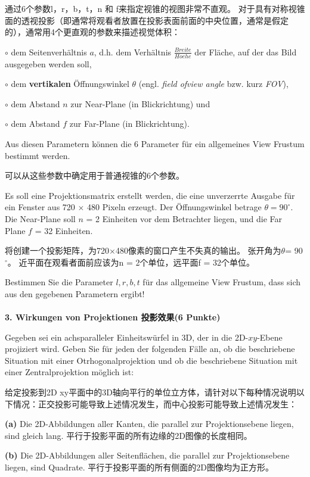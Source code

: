 \documentclass[fleqn]{article}
\begin{document}
通过6个参数l，r，b，t，n 和 f来指定视锥的视图非常不直观。 对于具有对称视锥面的透视投影（即通常将观看者放置在投影表面前面的中央位置，通常是假定的），通常用4个更直观的参数来描述视觉体积：

\indent\indent $\circ$ dem Seitenverhältnis $a$, d.h. dem Verhältnis $\frac{Breite}{Hoehe}$ der Fläche, auf der das Bild ausgegeben werden soll,

\indent\indent $\circ$ dem \textbf{vertikalen} Öffnungswinkel $\theta$ (engl. \textit{field ofview angle} bzw. kurz \textit{FOV}),

\indent\indent $\circ$ dem Abstand $n$ zur Near-Plane (in Blickrichtung) und

\indent\indent $\circ$ dem Abstand $f$ zur Far-Plane (in Blickrichtung).

Aus diesen Parametern können die 6 Parameter für ein allgemeines View Frustum bestimmt werden.

可以从这些参数中确定用于普通视锥的6个参数。

Es soll eine Projektionsmatrix erstellt werden,
 die eine unverzerrte Ausgabe für ein Fenster aus 720 $\times$ 480 Pixeln erzeugt. 
 Der Öffnungswinkel betrage $\theta=90^\circ$. 
 Die Near-Plane soll $n$ = 2 Einheiten vor dem Betrachter liegen, 
 und die Far Plane $f$ = 32 Einheiten.

将创建一个投影矩阵，为720$\times$480像素的窗口产生不失真的输出。 张开角为$\theta$= 90$^\circ$。 近平面在观看者面前应该为n = 2个单位，远平面f = 32个单位。

Bestimmen Sie die Parameter $l, r, b, t$ für das allgemeine View Frustum, dass sich aus den gegebenen Parametern ergibt!
\\
\\
\noindent\textbf{3. Wirkungen von Projektionen 投影效果(6 Punkte)}

Gegeben sei ein achsparalleler Einheitswürfel in 3D, der in die 2D-$xy$-Ebene projiziert wird.
 Geben Sie für jeden der folgenden Fälle an, ob die beschriebene Situation mit einer Otrhogonalprojektion und ob die beschriebene Situation mit einer Zentralprojektion möglich ist:

给定投影到2D xy平面中的3D轴向平行的单位立方体，请针对以下每种情况说明以下情况：正交投影可能导致上述情况发生，而中心投影可能导致上述情况发生：

\indent\textbf{(a)} Die 2D-Abbildungen aller Kanten, die parallel zur Projektionsebene liegen, sind gleich lang.
平行于投影平面的所有边缘的2D图像的长度相同。

\indent\textbf{(b)} Die 2D-Abbildungen aller Seitenflächen, die parallel zur Projektionsebene liegen, sind Quadrate.
平行于投影平面的所有侧面的2D图像均为正方形。
\end{document}
